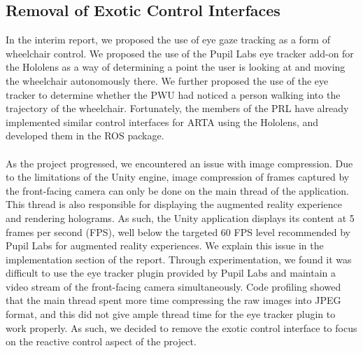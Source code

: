 \subsection{Removal of Exotic Control Interfaces} \label{sec:eyeTracker}
In the interim report, we proposed the use of eye gaze tracking as a form of wheelchair control. We proposed the use of the Pupil Labs eye tracker add-on for the Hololens as a way of determining a point the user is looking at and moving the wheelchair autonomously there. We further proposed the use of the eye tracker to determine whether the PWU had noticed a person walking into the trajectory of the wheelchair. Fortunately, the members of the PRL have already implemented similar control interfaces for ARTA using the Hololens, and developed them in the  ROS package.

\paragraph{}As the project progressed, we encountered an issue with image compression. Due to the limitations of the Unity engine, image compression of frames captured by the front-facing camera can only be done on the main thread of the application. This thread is also responsible for displaying the augmented reality experience and rendering holograms. As such, the Unity application displays its content at 5 frames per second (FPS), well below the targeted 60 FPS level recommended by Pupil Labs for augmented reality experiences. We explain this issue in the implementation section of the report. Through experimentation, we found it was difficult to use the eye tracker plugin provided by Pupil Labs and maintain a video stream of the front-facing camera simultaneously. Code profiling showed that the main thread spent more time compressing the raw images into JPEG format, and this did not give ample thread time for the eye tracker plugin to work properly.  As such, we decided to remove the exotic control interface to focus on the reactive control aspect of the project.